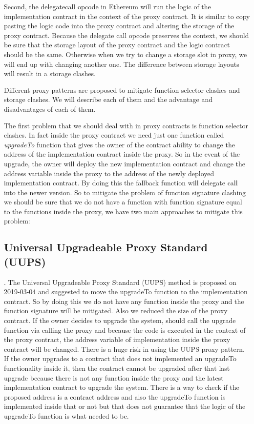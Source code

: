 Second, the delegatecall opcode in Ethereum will run the logic of the implementation contract in the context of the proxy contract. It is similar to copy pasting the logic code into the proxy contract and altering the storage of the proxy contract. Because the delegate call opcode preserves the context, we should be sure that the storage layout of the proxy contract and the logic contract should be the same. Otherwise when we try to change a storage slot in proxy, we will end up with changing another one. The difference between storage layouts will result in a storage clashes. 


Different proxy patterns are proposed to mitigate function selector clashes and storage clashes. We will describe each of them and the advantage and disadvantages of each of them.

The first problem that we should deal with in proxy contracts is function selector clashes. In fact inside the proxy contract we need just one function called \textit{upgradeTo} function that gives the owner of the contract ability to change the address of the implementation contract inside the proxy. So in the event of the upgrade, the owner will deploy the new implementation contract and change the address variable inside the proxy to the address of the newly deployed implementation contract. By doing this the fallback function will delegate call into the newer version. So to mitigate the problem of function signature clashing we should be sure that we do not have a function with function signature equal to the functions inside the proxy, we have two main approaches to mitigate this problem:

\subsection{Universal Upgradeable Proxy Standard (UUPS)}. 
The Universal Upgradeable Proxy Standard (UUPS) method is proposed on 2019-03-04 and suggested to move the upgradeTo function to the implementation contract. So by doing this we do not have any function inside the proxy and the function signature will be mitigated. Also we reduced the size of the proxy contract. If the owner decides to upgrade the system, should call the upgrade function via calling the proxy and because the code is executed in the context of the proxy contract, the address variable of implementation inside the proxy contract will be changed.
There is a huge risk in using the UUPS proxy pattern. If the owner upgrades to a contract that does not implemented an upgradeTo functionality inside it, then the contract cannot be upgraded after that last upgrade because there is not any function inside the proxy and the latest implementation contract to upgrade the system. There is a way to check if the proposed address is a contract address and also the upgradeTo function is implemented inside that or not but that does not guarantee that the logic of the upgradeTo function is what needed to be.


